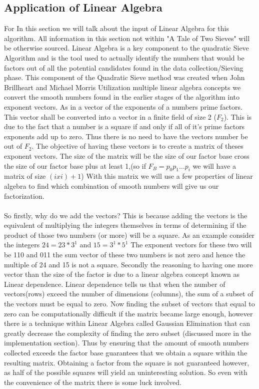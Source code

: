 \documentclass[12pt]{article} %
\begin{document}
\subsection{Application of Linear Algebra}
\indent For In this section we will talk about the input of Linear Algebra for this algorithm. All information in this section not within "A Tale of Two Sieves" will be otherwise sourced. Linear Algebra is a key component to the quadratic Sieve Algorithm and is the tool used to actually identify the numbers that would be factors out of all the potential candidates found in the data collection/Sieving phase. This component of the Quadratic Sieve method was created when John Brillheart and Michael Morris Utilization multiple linear algebra concepts we convert the smooth numbers found in the earlier stages of the algorithm into exponent vectors. As in a vector of the exponents of a numbers prime factors. This vector shall be converted into a vector in a finite field of size 2 ($F_2$). This is due to the fact that a number is a square if and only if all of it's prime factors exponents add up to zero. Thus there is no need to have the vectors number be out of $F_2$. The objective of having these vectors is to create a matrix of theses exponent vectors. The size of the matrix will be the size of our factor base cross the size of our factor base plus at least 1,(so if $F_B = p_0p_1\dots p_i$ we will have a matrix of size $(ixi)+1$) With this matrix we will use a few properties of linear algebra to find which combination of smooth numbers will give us our factorization. 
\\\\
\indent So firstly, why do we add the vectors? This is because adding the vectors is the equivalent of multiplying the integers themselves in terms of determining if the product of those two numbers (or more) will be a square. As an example consider the integers $24 = 2{3}*3^{1}$ and $15 = 3^{1}*5^{1} $ The exponent vectors for these two will be 110 and 011 the sum vector of these two numbers is not zero and hence the multiple of 24 and 15 is not a square. Secondly the reasoning to having one more vector than the size of the factor is due to a linear algebra concept known as Linear dependence. Linear dependence tells us that when the number of vectors(rows) exceed the number of dimensions (columns), the sum of a subset of the vectors must be equal to zero. Now finding the subset of vectors that equal to zero can be computationally difficult if the matrix became large enough, however there is a technique within Linear Algebra called Gaussian Elimination that can greatly decrease the complexity of finding the zero subset (discussed more in the implementation section). Thus by ensuring that the amount of smooth numbers collected exceeds the factor base guarantees that we obtain a square within the resulting matrix. Obtaining a factor from the square is not guaranteed however, as half of the possible squares will yield an uninteresting solution. So even with the convenience of the matrix there is some luck involved.
\end{document}

